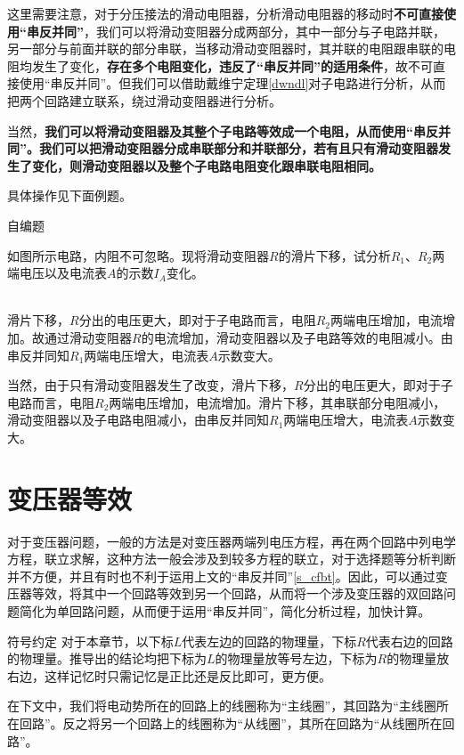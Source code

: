 这里需要注意，对于分压接法的滑动电阻器，分析滑动电阻器的移动时\textbf{不可直接使用“串反并同”}，我们可以将滑动变阻器分成两部分，其中一部分与子电路并联，另一部分与前面并联的部分串联，当移动滑动变阻器时，其并联的电阻跟串联的电阻均发生了变化，\textbf{存在多个电阻变化，违反了“串反并同”的适用条件}，故不可直接使用“串反并同”。但我们可以借助戴维宁定理\eqref{dwndl}对子电路进行分析，从而把两个回路建立联系，绕过滑动变阻器进行分析。

当然，\textbf{我们可以将滑动变阻器及其整个子电路等效成一个电阻，从而使用“串反并同”。我们可以把滑动变阻器分成串联部分和并联部分，若有且只有滑动变阻器发生了变化，则滑动变阻器以及整个子电路电阻变化跟串联电阻相同。}

具体操作见下面例题。

\begin{ep}{自编题}{}

如图所示电路，内阻不可忽略。现将滑动变阻器$R$的滑片下移，试分析$R_1$、$R_2$两端电压以及电流表$A$的示数$I_A$变化。

~\\
滑片下移，$R$分出的电压更大，即对于子电路而言，电阻$R_2$两端电压增加，电流增加。故通过滑动变阻器$R$的电流增加，滑动变阻器以及子电路等效的电阻减小。由串反并同知$R_1$两端电压增大，电流表$A$示数变大。

当然，由于只有滑动变阻器发生了改变，滑片下移，$R$分出的电压更大，即对于子电路而言，电阻$R_2$两端电压增加，电流增加。滑片下移，其串联部分电阻减小，滑动变阻器以及子电路电阻减小，由串反并同知$R_1$两端电压增大，电流表$A$示数变大。

\end{ep}

\section{变压器等效}

对于变压器问题，一般的方法是对变压器两端列电压方程，再在两个回路中列电学方程，联立求解，这种方法一般会涉及到较多方程的联立，对于选择题等分析判断并不方便，并且有时也不利于运用上文的“串反并同”\eqref{s_cfbt}。因此，可以通过变压器等效，将其中一个回路等效到另一个回路，从而将一个涉及变压器的双回路问题简化为单回路问题，从而便于运用“串反并同”，简化分析过程，加快计算。

\begin{mk}{符号约定}{}
对于本章节，以下标$L$代表左边的回路的物理量，下标$R$代表右边的回路的物理量。推导出的结论均把下标为$L$的物理量放等号左边，下标为$R$的物理量放右边，这样记忆时只需记忆是正比还是反比即可，更方便。

在下文中，我们将电动势所在的回路上的线圈称为“主线圈”，其回路为“主线圈所在回路”。反之将另一个回路上的线圈称为“从线圈”，其所在回路为“从线圈所在回路”。
\end{mk}

